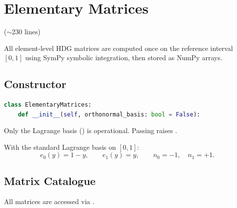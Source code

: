 \section{Elementary Matrices}
\label{sec:elementary_matrices}

\begin{center}
 \quad($\sim$230 lines)
\end{center}

All element-level HDG matrices are computed once on the reference interval
$[0,1]$ using SymPy symbolic integration, then stored as NumPy arrays.

\subsection{Constructor}

\begin{lstlisting}[language=Python, caption={ElementaryMatrices constructor}]
class ElementaryMatrices:
    def __init__(self, orthonormal_basis: bool = False):
\end{lstlisting}

\noindent Only the Lagrange basis () is operational.
Passing  raises .

With the standard Lagrange basis on $[0,1]$:
\[
  e_0(y) = 1-y, \qquad e_1(y) = y, \qquad n_0 = -1, \quad n_1 = +1.
\]

\subsection{Matrix Catalogue}

All matrices are accessed via .

